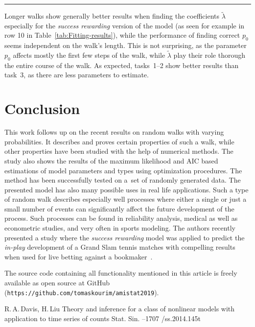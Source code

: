 \hrule height0pt
\endinsert

Longer walks show generally better results when finding the coefficients $\tilde{\lambda}$ especially for the \emph{success rewarding} version of the model (as seen for example in row 10 in Table~\ref{tab:Fitting-results}), while the performance of finding correct $p_0$ seems independent on the walk's length.
This is not surprising, as the parameter $p_0$ affects mostly the first few steps of the walk, while $\tilde{\lambda}$ play their role thorough the entire course of the walk.
As expected, tasks~1--2 show better results than task~3, as there are less parameters to estimate.



\section{Conclusion}\label{sec:Conclusion}

This work follows up on the recent results on random walks with varying
probabilities.
It describes and proves certain properties of such
a walk, while other properties have been studied with the help of numerical
methods.
The study also shows the results of the maximum likelihood
and AIC based estimations of model parameters and types using optimization
procedures.
The method has been successfully tested on a~set of randomly
generated data.
The presented model has also many possible uses in
real life applications.
Such a type of random walk describes especially
well processes where either a single or just a small number of events
can significantly affect the future development of the process.
Such
processes can be found in reliability analysis, medical as well as
econometric studies, and very often in sports modeling.
The authors recently presented a study where the \emph{success rewarding} model was applied
to predict the \emph{in-play} development of a Grand Slam tennis matches
with compelling results when used for live betting against a bookmaker~\cite{ja2019mathsport_proc}.

The source code containing all functionality mentioned in this article
is freely available as open source at
GitHub ({\tt https://github.com/tomaskourim/amistat2019}).



\Refs

\by R.\,A.\,Davis, H.\,Liu
\paper Theory and inference for a class of nonlinear models with application to time series of counts
\jour Stat. Sin.
  --1707
/ss.2014.145t

